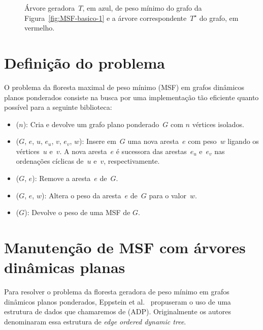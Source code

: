 \begin{figure}[htb]
\scalebox{1.5}{
\centering

}
\caption{Árvore geradora~$T$, em azul, de peso mínimo do grafo da Figura~\ref{fig:MSF-basico-1} e a árvore correspondente~$T^\star$ do grafo, em vermelho.}
\label{fig:MSF-figura-2}
\end{figure}





\section{Definição do problema}
\label{sec:definition-MSF}
O problema da floresta maximal de peso mínimo (MSF) em grafos dinâmicos planos ponderados consiste na busca por uma implementação tão eficiente quanto possível para a seguinte biblioteca:

\begin{itemize}
\item \MSFCreate($n$): Cria e devolve um grafo plano ponderado~$G$ com $n$ vértices isolados.
\item \MSFaddEdge($G$, $e$, $u$, $e_u$, $v$, $e_v$, $w$): Insere em~$G$ uma nova aresta~$e$ com peso~$w$ ligando os vértices~$u$ e~$v$. A nova aresta~$e$ é sucessora das arestas~$e_u$ e~$e_v$ nas ordenações cíclicas de~$u$ e~$v$, respectivamente.
\item \MSFdelEdge($G$, $e$): Remove a aresta~$e$ de~$G$.
\item \MSFupdate($G$, $e$, $w$): Altera o peso da aresta~$e$ de~$G$ para o valor~$w$.
\item \MSFweight($G$): Devolve o peso de uma MSF de $G$.
\end{itemize}


\section{Manutenção de MSF com árvores dinâmicas planas}

Para resolver o problema da floresta geradora de peso mínimo em grafos dinâmicos planos ponderados, Eppstein et al.~\cite{EPPSTEIN-planar} propuseram o uso de uma estrutura de dados que chamaremos de  (ADP). Originalmente os autores denominaram essa estrutura de \textit{edge ordered dynamic tree}.


